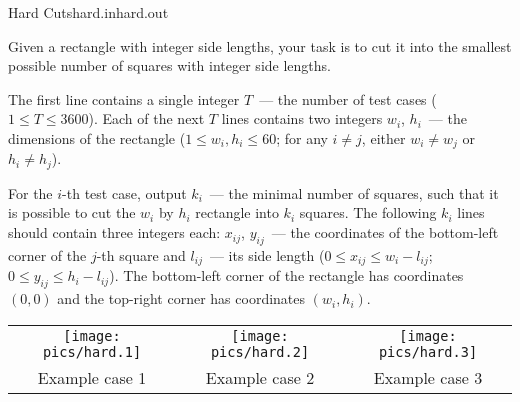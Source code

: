 \begin{problem}{Hard Cuts}{hard.in}{hard.out}{\timeLimit}


Given a rectangle with integer side lengths, your task is to cut it into the smallest possible number of squares with integer side lengths.

\InputFile

The first line contains a single integer $T$~--- the number of test cases
($1 \le T \le 3600$).
Each of the next $T$ lines contains two integers $w_i$, $h_i$~---
the dimensions of the rectangle
($1 \le w_i, h_i \le 60$; for any $i \ne j$, either $w_i \ne w_j$ or $h_i \ne h_j$).

\OutputFile

For the $i$-th test case, output $k_i$~--- the minimal number of squares,
such that it is possible to cut the $w_i$ by $h_i$ rectangle into $k_i$ squares.
The following $k_i$ lines should contain three integers each:
$x_{ij}$, $y_{ij}$~--- the coordinates of the bottom-left corner of the $j$-th square
and $l_{ij}$~--- its side length
($0 \le x_{ij} \le w_i - l_{ij}$; $0 \le y_{ij} \le h_i - l_{ij}$).
The bottom-left corner of the rectangle has coordinates $(0, 0)$ and
the top-right corner has coordinates $(w_i, h_i)$.

\Example

\begin{example}
%
\end{example}

\begin{center}
\begin{tabular}{ccc}
    \texttt{[image: pics/hard.1]} &
    \texttt{[image: pics/hard.2]} &
    \texttt{[image: pics/hard.3]} \\
    Example case 1 &
    Example case 2 &
    Example case 3
\end{tabular}
\end{center}
\end{problem}
